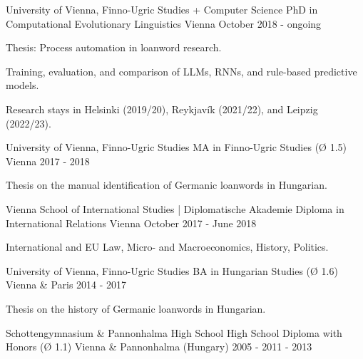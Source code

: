 

\begin{cventries}

  \cventry
    {University of Vienna, Finno-Ugric Studies + Computer Science} %
    {PhD in Computational Evolutionary Linguistics} %
    {Vienna} %
    {October 2018 - ongoing} %
    {
      \begin{cvitems} %
        \item{Thesis: Process automation in loanword research.}
        \item{Training, evaluation, and comparison of LLMs, RNNs, and rule-based predictive models.}
        \item{Research stays in Helsinki (2019/20), Reykjavík (2021/22), and Leipzig (2022/23).}
      \end{cvitems}
    }

  \cventry
    {University of Vienna, Finno-Ugric Studies} %
    {MA in Finno-Ugric Studies (Ø 1.5)} %
    {Vienna} %
    {2017 - 2018} %
    {
      \begin{cvitems} %
        \item{Thesis on the manual identification of Germanic loanwords in Hungarian.}
      \end{cvitems}
    }

  \cventry
    {Vienna School of International Studies | Diplomatische Akademie} %
    {Diploma in International Relations} %
    {Vienna} %
    {October 2017 - June 2018} %
    {
    \begin{cvitems} %
        \item{International and EU Law, Micro- and Macroeconomics, History, Politics.}
      \end{cvitems}
    }
    
  \cventry
    {University of Vienna, Finno-Ugric Studies} %
    {BA in Hungarian Studies (Ø 1.6)} %
    {Vienna \& Paris} %
    {2014 - 2017} %
    {
      \begin{cvitems} %
        \item{Thesis on the history of Germanic loanwords in Hungarian.}
      \end{cvitems}
    }
        
  \cventry
    {Schottengymnasium \& Pannonhalma High School} %
    {High School Diploma with Honors (Ø 1.1)} %
    {Vienna \& Pannonhalma (Hungary)} %
    {2005 - 2011 - 2013} %
    {}
\end{cventries}

